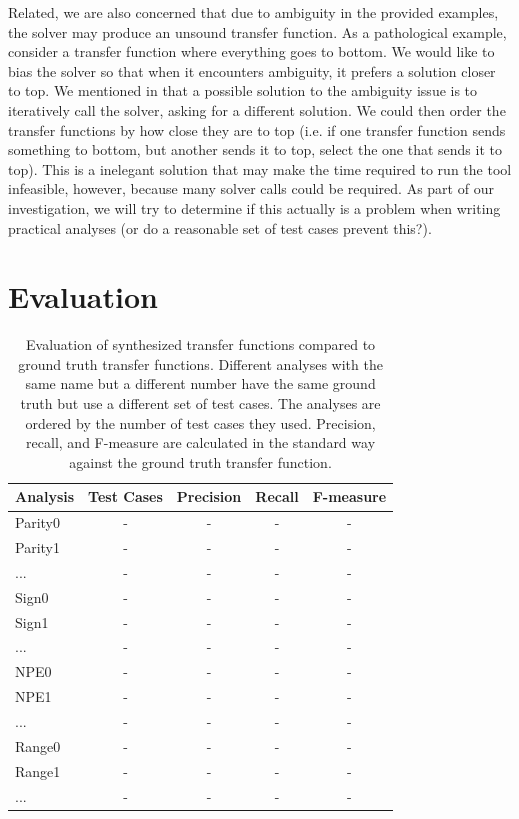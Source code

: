 \documentclass[10pt,conference]{IEEEtran}
\begin{document}
Related, we are also concerned that due to ambiguity in the provided
examples, the solver may produce an unsound transfer function.
As a pathological example, consider a transfer function where
everything goes to bottom. We would like to bias the solver
so that when it encounters ambiguity, it prefers a solution
closer to top. We mentioned in  that a possible solution
to the ambiguity issue is to iteratively call the solver, asking for
a different solution. We could then order the transfer functions
by how close they are to top (i.e. if one transfer function sends something
to bottom, but another sends it to top, select the one that sends it to top).
This is a inelegant solution that may make the
time required to run the tool infeasible, however, because
many solver calls could be required.
As part of our investigation, we will try to
determine if this actually is a problem when writing practical
analyses (or do a reasonable set of test cases prevent this?).

\section{Evaluation}

\begin{table}
\centering
 \begin{tabular}{l c c c c }
  
  Analysis & Test Cases & Precision & Recall & F-measure\\ 
  \midrule
  Parity0 & - & - & - & - \\
  Parity1 & - & - & - & - \\
  ... & - & - & - & - \\
  Sign0 & - & - & - & - \\
  Sign1 & - & - & - & - \\
  ... & - & - & - & - \\
  NPE0 & - & - & - & - \\
  NPE1 & - & - & - & - \\
  ... & - & - & - & - \\
  Range0 & - & - & - & - \\
  Range1 & - & - & - & - \\
  ... & - & - & - & - \\
 \end{tabular}
 \caption{Evaluation of synthesized transfer functions compared
 to ground truth transfer functions. Different analyses with
 the same name but a different number have the same ground truth
 but use a different set of test cases. The analyses are ordered
 by the number of test cases they used. Precision, recall, and
 F-measure are calculated in the standard way against the ground
 truth transfer function.}
 \label{tab-analyses}
\end{table}
\end{document}

